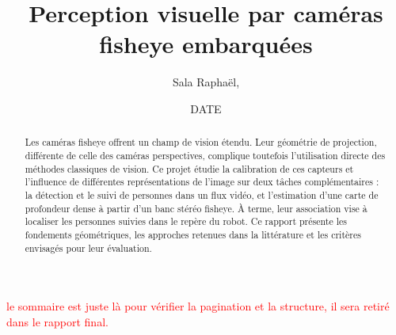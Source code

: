 \documentclass[11pt,a4paper]{article}
\title{\textbf{Perception visuelle par caméras fisheye embarquées}}
\author{Sala Raphaël, }
\date{DATE}
\begin{document}
\maketitle


\begin{abstract}
Les caméras fisheye offrent un champ de vision étendu. Leur géométrie de projection, différente de celle des caméras perspectives, complique toutefois l'utilisation directe des méthodes classiques de vision. Ce projet étudie la calibration de ces capteurs et l'influence de différentes représentations de l'image sur deux tâches complémentaires : la détection et le suivi de personnes dans un flux vidéo, et l'estimation d'une carte de profondeur dense à partir d'un banc stéréo fisheye. À terme, leur association vise à localiser les personnes suivies dans le repère du robot. Ce rapport présente les fondements géométriques, les approches retenues dans la littérature et les critères envisagés pour leur évaluation.
\end{abstract}


\textcolor{red}{le sommaire est juste là pour vérifier la pagination et la structure, il sera retiré dans le rapport final.}

\tableofcontents
\end{document}
